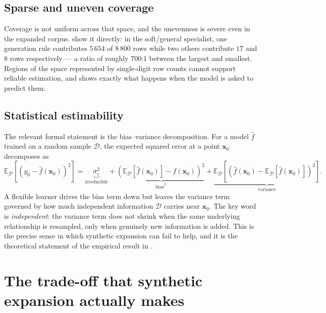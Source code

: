 \subsection{Sparse and uneven coverage}

Coverage is not uniform across that space, and the unevenness is severe
even in the expanded corpus. 
show it directly: in the soft/general specialist, one generation rule
contributes $5\,654$ of $8\,800$ rows while two others contribute $17$ and
$8$ rows respectively --- a ratio of roughly $700$:$1$ between the largest
and smallest. Regions of the space represented by single-digit row counts
cannot support reliable estimation, and  shows exactly what
happens when the model is asked to predict them.

\subsection{Statistical estimability}

The relevant formal statement is the bias--variance decomposition. For a
model $\hat{f}$ trained on a random sample $\mathcal{D}$, the expected
squared error at a point $\mathbf{x}_0$ decomposes as
\begin{equation}
\mathbb{E}_{\mathcal{D}}\!\left[\left(y_0 - \hat{f}(\mathbf{x}_0)\right)^2\right]
=
\underbrace{\sigma^2_{\varepsilon}}_{\text{irreducible}}
+
\underbrace{\left(\mathbb{E}_{\mathcal{D}}[\hat{f}(\mathbf{x}_0)] - f(\mathbf{x}_0)\right)^2}_{\text{bias}^2}
+
\underbrace{\mathbb{E}_{\mathcal{D}}\!\left[\left(\hat{f}(\mathbf{x}_0) - \mathbb{E}_{\mathcal{D}}[\hat{f}(\mathbf{x}_0)]\right)^2\right]}_{\text{variance}} .
\end{equation}
A flexible learner drives the bias term down but leaves the variance term
governed by how much independent information $\mathcal{D}$ carries near
$\mathbf{x}_0$. The key word is \emph{independent}: the variance term does
not shrink when the same underlying relationship is resampled, only when
genuinely new information is added. This is the precise sense in which
synthetic expansion can fail to help, and it is the theoretical statement
of the empirical result in .

\section{The trade-off that synthetic expansion actually makes}

